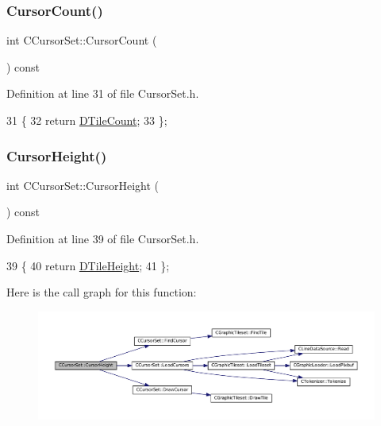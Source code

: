 \subsubsection{\texorpdfstring{Cursor\+Count()}{CursorCount()}}
{\footnotesize\ttfamily int C\+Cursor\+Set\+::\+Cursor\+Count (\begin{DoxyParamCaption}{ }\end{DoxyParamCaption}) const\hspace{0.3cm}{\ttfamily [inline]}}



Definition at line 31 of file Cursor\+Set.\+h.


\begin{DoxyCode}
31                                \{
32             \textcolor{keywordflow}{return} \hyperlink{classCGraphicTileset_a39d942b370e47f441bf97385eb1037c8}{DTileCount};
33         \};
\end{DoxyCode}
\hypertarget{classCCursorSet_a25ce1f3e861c3d4ea701bb2e810728a6}{}\label{classCCursorSet_a25ce1f3e861c3d4ea701bb2e810728a6} 
\subsubsection{\texorpdfstring{Cursor\+Height()}{CursorHeight()}}
{\footnotesize\ttfamily int C\+Cursor\+Set\+::\+Cursor\+Height (\begin{DoxyParamCaption}{ }\end{DoxyParamCaption}) const\hspace{0.3cm}{\ttfamily [inline]}}



Definition at line 39 of file Cursor\+Set.\+h.


\begin{DoxyCode}
39                                 \{
40             \textcolor{keywordflow}{return} \hyperlink{classCGraphicTileset_af48f32e07d5fe69afd5f764318cc3244}{DTileHeight};
41         \};
\end{DoxyCode}
Here is the call graph for this function\+:\nopagebreak
\begin{figure}[H]
\begin{center}
\leavevmode
\includegraphics[width=350pt]{classCCursorSet_a25ce1f3e861c3d4ea701bb2e810728a6_cgraph}
\end{center}
\end{figure}
\hypertarget{classCCursorSet_a6984a5bfd8b989c09f9ab8aac459993e}{}\label{classCCursorSet_a6984a5bfd8b989c09f9ab8aac459993e} 
